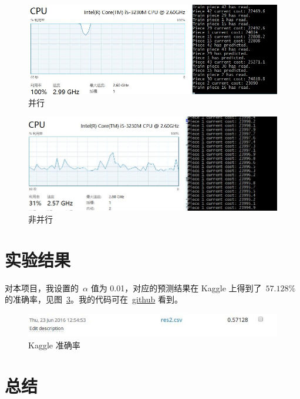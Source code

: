 \documentclass[hyperref, UTF8]{ctexart}
\begin{document}
\begin{figure}[H]
	\centering
	\includegraphics[width=384pt]{../results/parallel.jpg}
	\caption{并行}
	\label{fig:parallel}
\end{figure}

\begin{figure}[H]
	\centering
	\includegraphics[width=384pt]{../results/noparallel.jpg}
	\caption{非并行}
	\label{fig:noparallel}
\end{figure}

\section{实验结果}

对本项目，我设置的\ $\alpha$ 值为 0.01，对应的预测结果在 Kaggle 上得到了\ $57.128\%$  的准确率，见图~\ref{fig:kaggle}。我的代码可在\  \href{https://github.com/daix6/Data-Mining/tree/master/hw2}{github} 看到。

\begin{figure}[H]
	\centering
	\includegraphics[width=384pt]{../results/kaggle.jpg}
	\caption{Kaggle 准确率}
	\label{fig:kaggle}
\end{figure}

\section{总结}
\end{document}
